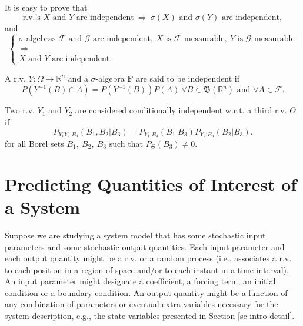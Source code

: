 It is easy to prove that
\begin{equation*}
\mbox{r.v.'s }X\mbox{ and }Y\mbox{ are independent}
~\Rightarrow~
\sigma(X)\mbox{ and }\sigma(Y)\mbox{ are independent},
\end{equation*}
and
\begin{equation*}
\left\{
\begin{array}{c}
\sigma\mbox{-algebras }\mathcal{F}\mbox{ and }\mathcal{G}\mbox{ are independent},~X\mbox{ is }\mathcal{F}\mbox{-measurable},~Y\mbox{ is }\mathcal{G}\mbox{-measurable} \\
~\Rightarrow~ \\
X\mbox{ and }Y\mbox{ are independent}.
\end{array}
\right.
\end{equation*}

A r.v. $Y:\Omega\rightarrow\mathbb{R}^n$ and a $\sigma$-algebra $\mathbf{F}$ are said to be independent if
\begin{equation}\label{eq-Y-F-independent}
P(Y^{-1}(B)\cap A) = P(Y^{-1}(B))P(A)~\forall B\in\mathfrak{B}(\mathbb{R}^n)\mbox{ and }\forall A\in\mathcal{F}.
\end{equation}

Two r.v. $Y_1$ and $Y_2$ are considered conditionally independent w.r.t. a third r.v. $\Theta$ if
\begin{equation*}
P_{Y_1Y_2|B_3}(B_1,B_2|B_3) = P_{Y_1|B_3}(B_1|B_3)P_{Y_2|B_3}(B_2|B_3).
\end{equation*}
for all Borel sets $B_1,~B_2,~B_3$ such that $P_{\Theta}(B_3)\neq 0$.

\section{Predicting Quantities of Interest of a System}\label{sc-intro-qoi}

Suppose we are studying a system model that has
some stochastic input parameters and some stochastic output quantities.
Each input parameter and each output quantity might be a r.v. or a random process
(i.e., associates a r.v. to each position in a region of space and/or to each instant in a time interval).
An input parameter might designate a coefficient, a forcing term, an initial condition or a boundary condition.
An output quantity might be a function of any combination of parameters or eventual extra variables necessary for the system description, e.g.,
the state variables presented in Section \ref{sc-intro-detail}.

